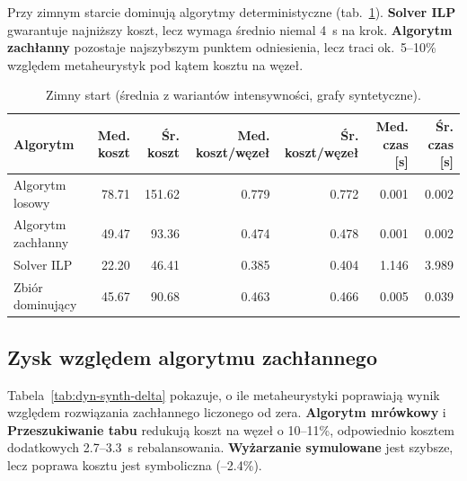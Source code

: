 Przy zimnym starcie dominują algorytmy deterministyczne (tab.~\ref{tab:dyn-synth-cold}). \textbf{Solver ILP} gwarantuje najniższy koszt, lecz wymaga średnio niemal 4~s na krok. \textbf{Algorytm zachłanny} pozostaje najszybszym punktem odniesienia, lecz traci ok.~5--10\% względem metaheurystyk pod kątem kosztu na węzeł.

\begin{table}[H]
  \centering
  \caption{Zimny start (średnia z wariantów intensywności, grafy syntetyczne).}
  \label{tab:dyn-synth-cold}
  \begin{tabular}{lrrrrrr}
    \toprule
    \textbf{Algorytm}  & \textbf{Med. koszt} & \textbf{Śr. koszt} & \textbf{Med. koszt/węzeł} & \textbf{Śr. koszt/węzeł} & \textbf{Med. czas [s]} & \textbf{Śr. czas [s]} \\
    \midrule
    Algorytm losowy    & 78.71               & 151.62             & 0.779                     & 0.772                    & 0.001                  & 0.002                 \\
    Algorytm zachłanny & 49.47               & 93.36              & 0.474                     & 0.478                    & 0.001                  & 0.002                 \\
    Solver ILP         & 22.20               & 46.41              & 0.385                     & 0.404                    & 1.146                  & 3.989                 \\
    Zbiór dominujący   & 45.67               & 90.68              & 0.463                     & 0.466                    & 0.005                  & 0.039                 \\
  \end{tabular}
\end{table}

\subsection{Zysk względem algorytmu zachłannego}

Tabela~\ref{tab:dyn-synth-delta} pokazuje, o ile metaheurystyki poprawiają wynik względem rozwiązania zachłannego liczonego od zera. \textbf{Algorytm mrówkowy} i \textbf{Przeszukiwanie tabu} redukują koszt na węzeł o 10--11\%, odpowiednio kosztem dodatkowych 2.7–3.3~s rebalansowania. \textbf{Wyżarzanie symulowane} jest szybsze, lecz poprawa kosztu jest symboliczna (–2.4\%).

